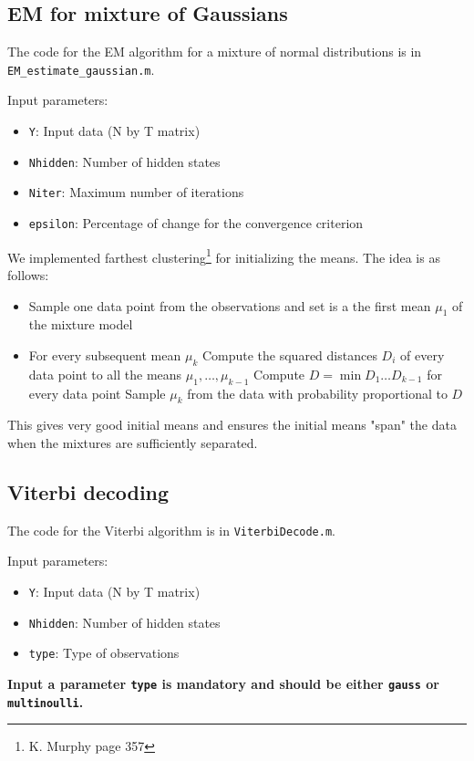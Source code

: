 \documentclass[10pt, a4paper]{article}
\begin{document}
\subsection{EM for mixture of Gaussians}
The code for the EM algorithm for a mixture of normal distributions is in \texttt{EM\_estimate\_gaussian.m}.

Input parameters:
\begin{itemize}
\item \texttt{Y}: Input data (N by T matrix)
\item \texttt{Nhidden}: Number of hidden states
\item \texttt{Niter}: Maximum number of iterations
\item \texttt{epsilon}: Percentage of change for the convergence criterion
\end{itemize}

We implemented farthest clustering\footnote{K. Murphy page 357} for initializing the means. The idea is as follows:
\begin{itemize}
\item Sample one data point from the observations and set is a the first mean $\mu_1$ of the mixture model
\item For every subsequent mean $\mu_k$
\subitem Compute the squared distances $D_i$ of every data point to all the means $\mu_1, \ldots, \mu_{k-1}$
\subitem Compute $D = \min D_1 \ldots D_{k-1}$ for every data point
\subitem Sample $\mu_k$ from the data with probability proportional to $D$
\end{itemize}

This gives very good initial means and ensures the initial means "span" the data when the mixtures are sufficiently separated.

\subsection{Viterbi decoding}
The code for the Viterbi algorithm is in \texttt{ViterbiDecode.m}.

Input parameters:
\begin{itemize}
\item \texttt{Y}: Input data (N by T matrix)
\item \texttt{Nhidden}: Number of hidden states
\item \texttt{type}: Type of observations
\end{itemize}

\textbf{Input a parameter \texttt{type} is mandatory and should be either \texttt{gauss} or \texttt{multinoulli}.}
\end{document}
